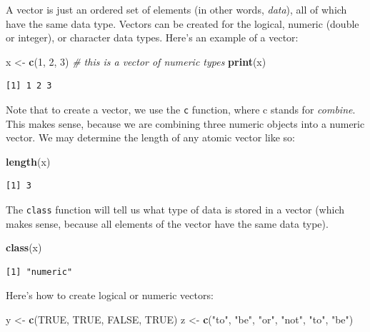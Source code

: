\documentclass[
]{book}
\newenvironment{Shaded}{\begin{snugshade}}{\end{snugshade}}
\newcommand{\CommentTok}[1]{\textcolor[rgb]{0.56,0.35,0.01}{\textit{#1}}}
\newcommand{\DecValTok}[1]{\textcolor[rgb]{0.00,0.00,0.81}{#1}}
\newcommand{\KeywordTok}[1]{\textcolor[rgb]{0.13,0.29,0.53}{\textbf{#1}}}
\newcommand{\NormalTok}[1]{#1}
\newcommand{\OtherTok}[1]{\textcolor[rgb]{0.56,0.35,0.01}{#1}}
\newcommand{\StringTok}[1]{\textcolor[rgb]{0.31,0.60,0.02}{#1}}
\begin{document}
A vector is just an ordered set of elements (in other words, \emph{data}), all of which have the same data type.
Vectors can be created for the logical, numeric (double or integer), or character data types.
Here's an example of a vector:

\begin{Shaded}
\begin{Highlighting}[]
\NormalTok{x <-}\StringTok{ }\KeywordTok{c}\NormalTok{(}\DecValTok{1}\NormalTok{, }\DecValTok{2}\NormalTok{, }\DecValTok{3}\NormalTok{)  }\CommentTok{# this is a vector of numeric types}
\KeywordTok{print}\NormalTok{(x)}
\end{Highlighting}
\end{Shaded}

\begin{verbatim}
[1] 1 2 3
\end{verbatim}

Note that to create a vector, we use the \texttt{c} function, where c stands for \emph{combine}.
This makes sense, because we are combining three numeric objects into a numeric vector.
We may determine the length of any atomic vector like so:

\begin{Shaded}
\begin{Highlighting}[]
\KeywordTok{length}\NormalTok{(x)}
\end{Highlighting}
\end{Shaded}

\begin{verbatim}
[1] 3
\end{verbatim}

The \texttt{class} function will tell us what type of data is stored in a vector (which makes sense, because all elements of the vector have the same data type).

\begin{Shaded}
\begin{Highlighting}[]
\KeywordTok{class}\NormalTok{(x)}
\end{Highlighting}
\end{Shaded}

\begin{verbatim}
[1] "numeric"
\end{verbatim}

Here's how to create logical or numeric vectors:

\begin{Shaded}
\begin{Highlighting}[]
\NormalTok{y <-}\StringTok{ }\KeywordTok{c}\NormalTok{(}\OtherTok{TRUE}\NormalTok{, }\OtherTok{TRUE}\NormalTok{, }\OtherTok{FALSE}\NormalTok{, }\OtherTok{TRUE}\NormalTok{)}
\NormalTok{z <-}\StringTok{ }\KeywordTok{c}\NormalTok{(}\StringTok{"to"}\NormalTok{, }\StringTok{"be"}\NormalTok{, }\StringTok{"or"}\NormalTok{, }\StringTok{"not"}\NormalTok{, }\StringTok{"to"}\NormalTok{, }\StringTok{"be"}\NormalTok{) }
\end{Highlighting}
\end{Shaded}
\end{document}
